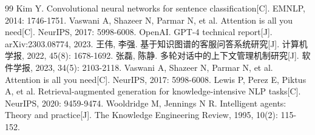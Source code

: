 \documentclass{harryopo-report}
\begin{document}
\begin{thebibliography}{99}
 Kim Y. Convolutional neural networks for sentence classification[C]. EMNLP, 2014: 1746-1751.
 Vaswani A, Shazeer N, Parmar N, et al. Attention is all you need[C]. NeurIPS, 2017: 5998-6008.
 OpenAI. GPT-4 technical report[J]. arXiv:2303.08774, 2023.
 王伟, 李强. 基于知识图谱的客服问答系统研究[J]. 计算机学报, 2022, 45(8): 1678-1692.
 张磊, 陈静. 多轮对话中的上下文管理机制研究[J]. 软件学报, 2023, 34(5): 2103-2118.
 Vaswani A, Shazeer N, Parmar N, et al. Attention is all you need[C]. NeurIPS, 2017: 5998-6008.
 Lewis P, Perez E, Piktus A, et al. Retrieval-augmented generation for knowledge-intensive NLP tasks[C]. NeurIPS, 2020: 9459-9474.
 Wooldridge M, Jennings N R. Intelligent agents: Theory and practice[J]. The Knowledge Engineering Review, 1995, 10(2): 115-152.
\end{thebibliography}
\end{document}

